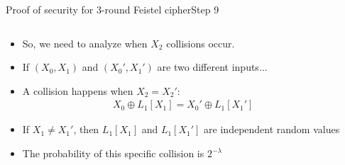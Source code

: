\documentclass[aspectratio=169, lualatex, handout]{beamer}
\begin{document}
\begin{frame}{Proof of security for 3-round Feistel cipher}{Step 9}
	\begin{columns}[c]
		\begin{column}{0.6\textwidth}
			\begin{itemize}[<+->]
				\item So, we need to analyze when $X_2$ collisions occur.
				\item If $(X_0, X_1)$ and $(X_0', X_1')$ are two different inputs...
				\item A collision happens when $X_2 = X_2'$:
				      \begin{align*}
					      X_0 \oplus L_1[X_1] = X_0' \oplus L_1[X_1']
				      \end{align*}
				\item If $X_1 \neq X_1'$, then $L_1[X_1]$ and $L_1[X_1']$ are independent random values
				\item The probability of this specific collision is $2^{-\lambda}$
			\end{itemize}
		\end{column}
		\begin{column}{0.4\textwidth}
			\vspace{-1.5cm}
			\begin{center}
			\end{center}
		\end{column}
	\end{columns}
\end{frame}
\end{document}
